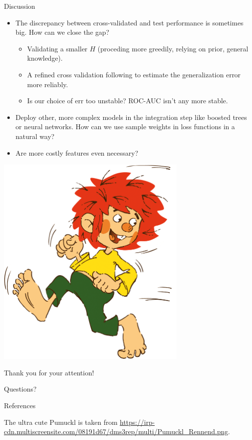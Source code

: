 \documentclass[10pt, aspectratio=169]{beamer}
\begin{document}
\begin{frame}{Discussion}
  \begin{itemize}
    \item The discrepancy between cross-validated and test performance is 
      sometimes big. How can we close the gap? \pause
      \begin{itemize}
        \item Validating a smaller $H$ (proceding more greedily, relying on 
          prior, general knowledge).
        \item A refined cross validation following \citep{nested-cv-hastie} to 
          estimate the generalization error more reliably.
        \item Is our choice of $\text{err}$ too unstable? ROC-AUC isn't any 
          more stable.
      \end{itemize}
    \pause
    \item Deploy other, more complex models in the integration step like boosted 
      trees or neural networks. How can we use sample weights in loss functions 
      in a natural way?
    \pause
    \item Are more costly features even necessary?
  \end{itemize}
\end{frame}

\begin{frame}[standout]
  \begin{minipage}{0.45\textwidth}
    \centering
    \includegraphics[width=0.7\textwidth]{figs/pumuckl.png}
  \end{minipage}
  \hfill
  \begin{minipage}{0.50\textwidth}
      \centering
      Thank you for your attention! \par Questions?
  \end{minipage}
\end{frame}

\appendix

\begin{frame}[allowframebreaks]{References}
  
  The ultra cute Pumuckl is taken from 
  \url{https://irp-cdn.multiscreensite.com/08191d67/dms3rep/multi/Pumuckl_Rennend.png}.
\end{frame}
\end{document}
